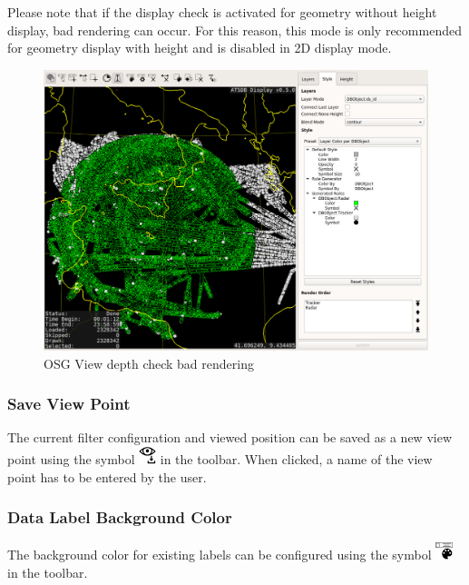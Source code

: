 Please note that if the display check is activated for geometry without height display, bad rendering can occur. For this reason, this mode is only recommended for geometry display with height and is disabled in 2D display mode.

\begin{figure}[H]
    \hspace*{-2.5cm}
    \includegraphics[width=19cm,frame]{../screenshots/osgview_depth_check_bad.png}
  \caption{OSG View depth check bad rendering}
\end{figure}

\subsubsection{Save View Point}

The current filter configuration and viewed position can be saved as a new view point using the symbol \includegraphics[width=0.5cm,frame]{../../data/icons/vp_save.png} in the toolbar. When clicked, a name of the view point has to be entered by the user. 

\subsubsection{Data Label Background Color}

The background color for existing labels can be configured using the symbol \includegraphics[width=0.5cm,frame]{../../data/icons/label_color.png} in the toolbar.

